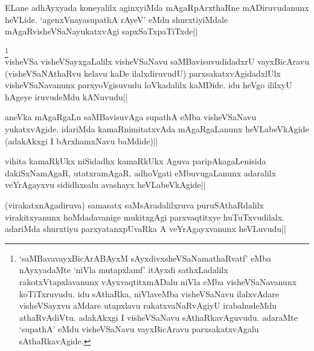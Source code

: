 \begin{artha}
ELane adhAyxyada koneyalilx aginxyiMda mAgaRpArxthaRne mADiruvudanunx 
heVLide. `agenxVnayasupathA rAyeV' eMdu shurxtiyiMdale 
mAgaRvisheVSaNayukatxvAgi sapxSaTxpaTiTxde||
\end{artha}


\begin{artha}
\footnote[1]{`saMBavavayxBicArABAyxM sAyxdivxsheVSaNamathaRvatf' eMba 
nAyxyadaMte `niVla mutapxlamf' itAyxdi sathxLadalilx 
rakotxVtapxlavanunx vAyxvaqtitxmADalu niVla eMba visheVSaNavanunx 
koTiTxruvudu. idu sAthaRka, niVlaveMba visheVSaNavu ilalxvAdare 
visheVSayxvu aMdare utapxlavu rakatxvaNaRvAgiyU irabahudeMdu 
athaRvAdiVtu. adakAkxgi I visheVSaNavu sAthaRkavAguvudu. adaraMte 
`supathA' eMdu visheVSaNavu vayxBicAravu parxsakatxvAgalu 
sAthaRkavAgide.}\\
visheVSa visheVSayxgaLalilx visheVSaNavu saMBavisuvudidadxrU 
vayxBicAravu (visheVSaNAthaRvu kelavu kaDe ilalxdiruvudU) 
parxsakatxvAgidadxlUlx visheVSaNavanunx parxyoVgisuvudu loVkadalilx 
kaMDide. idu heVgo ililxyU hAgeye iruvudeMdu kANuvudu||
\end{artha}


\begin{artha}
aneVka mAgaRgaLu saMBavisuvAga supathA eMba visheVSaNavu yukatxvAgide. 
idariMda kamaRnimitatxvAda mAgaRgaLanunx heVLabeVkAgide (adakAkxgi I 
bArxhamxNavu baMdide)||
\end{artha}


\begin{artha}
vihita kamaRkUkx niSidadhx kamaRkUkx Aguva paripAkagaLenisida 
dakiSxNamAgaR, utatxramAgaR, adhoVgati eMbuvugaLanunx adaralilx 
veYrAgayxvu sididhxsalu avashayx heVLabeVkAgide||
\end{artha}


\begin{artha}
(virakatxnAgadiruva) samasatx saMsAradalilxruva puruSAthaRdalilx 
virakitxyanunx hoMdadavanige mukitxgAgi parxvaqtitxye huTuTxvudilalx. 
adariMda shurxtiyu parxyatanxpUvaRka A veYrAgayxvanunx heVLuvudu||
\end{artha}



